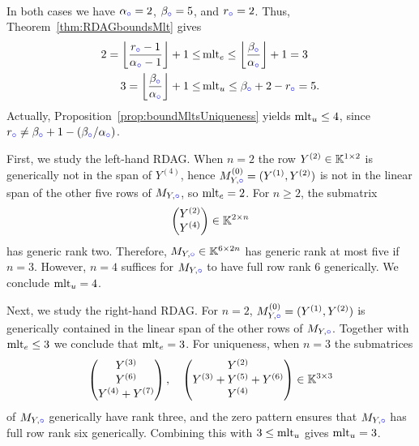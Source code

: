 \begin{example}
\begin{equation*}
\begin{matrix}
		\end{matrix}
	\end{equation*}
	In both cases we have $\alpha_{\color{blue}\circ} = 2$, $\beta_{\color{blue}\circ} = 5$, and $r_{\color{blue}\circ} = 2$. Thus, Theorem~\ref{thm:RDAGboundsMlt} gives
	\begin{align*}
		2 = \left\lfloor \frac{r_{\color{blue}\circ}-1}{\alpha_{\color{blue}\circ}-1} \right\rfloor + 1 \leq &\operatorname{mlt}_e \leq \left\lfloor \frac{\beta_{\color{blue}\circ}}{\alpha_{\color{blue}\circ}} \right\rfloor + 1 = 3
		\\
		3 = \left\lfloor \frac{\beta_{\color{blue}\circ}}{\alpha_{\color{blue}\circ}} \right\rfloor + 1 \leq &\operatorname{mlt}_u \leq \beta_{\color{blue}\circ} + 2 - r_{\color{blue}\circ} = 5.
	\end{align*}
	Actually, Proposition~\ref{prop:boundMltsUniqueness} yields $\operatorname{mlt}_u \leq 4$, since $r_{\color{blue}\circ} \neq \beta_{\color{blue}\circ} + 1 - (\beta_{\color{blue}\circ} / \alpha_{\color{blue}\circ})$.
	
	First, we study the left-hand RDAG. When $n=2$ the row $Y^{(2)} \in \mathbb K^{1 \times 2}$ is generically not in the span of $Y^{(4)}$, hence $M_{Y,{\color{blue}\circ}}^{(0)} = (Y^{(1)}, Y^{(2)})$ is not in the linear span of the other five rows of $M_{Y,{\color{blue}\circ}}$, so $\operatorname{mlt}_e = 2$. For $n \geq 2$, the submatrix
	\begin{align*}
		\begin{pmatrix}
			Y^{(2)} \\ Y^{(4)}
		\end{pmatrix} \in \mathbb K^{2 \times n}
	\end{align*}
	has generic rank two. Therefore, $M_{Y,{\color{blue}\circ}} \in \mathbb K^{6 \times 2n}$ has generic rank at most five if $n = 3$. However, $n=4$ suffices for $M_{Y,{\color{blue}\circ}}$ to have full row rank $6$ generically. We conclude $\operatorname{mlt}_u = 4$.
	
	Next, we study the right-hand RDAG. For $n=2$, $M_{Y,{\color{blue}\circ}}^{(0)} = (Y^{(1)}, Y^{(2)})$ is generically contained in the linear span of the other rows of $M_{Y,{\color{blue}\circ}}$. Together with $\operatorname{mlt}_e \leq 3$ we conclude that $\operatorname{mlt}_e = 3$. For uniqueness, when $n = 3$ the submatrices
	\begin{align*}
		\begin{pmatrix}
			Y^{(3)} \\ Y^{(6)} \\ Y^{(4)} + Y^{(7)}
		\end{pmatrix},
		\quad
		\begin{pmatrix}
			Y^{(2)} \\ Y^{(3)} + Y^{(5)} + Y^{(6)} \\ Y^{(4)}
		\end{pmatrix} \in \mathbb K^{3 \times 3}
	\end{align*}
	of $M_{Y,{\color{blue}\circ}}$ generically have rank three, and the zero pattern ensures that $M_{Y,{\color{blue}\circ}}$ has full row rank six generically. Combining this with $3 \leq \operatorname{mlt}_u$ gives $\operatorname{mlt}_u = 3$.
	\hfill\exSymbol
\end{example}

